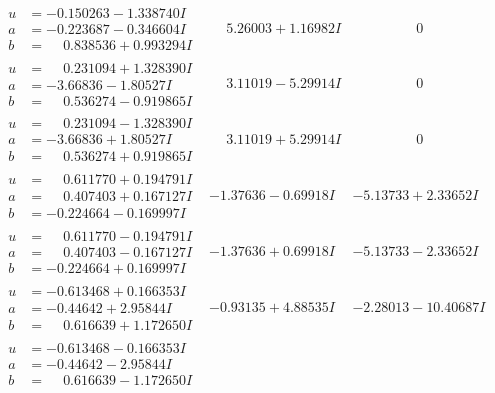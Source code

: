 \documentclass[1p]{elsarticle_modified}
\theoremstyle{definition}
\begin{document}
$$\begin{array}{c|c|c}
\begin{aligned}
u &= -0.150263 - 1.338740 I \\
a &= -0.223687 - 0.346604 I \\
b &= \phantom{-}0.838536 + 0.993294 I\end{aligned}
 & \phantom{-}5.26003 + 1.16982 I & \phantom{-0.000000 } 0 \\ \hline\begin{aligned}
u &= \phantom{-}0.231094 + 1.328390 I \\
a &= -3.66836 - 1.80527 I \\
b &= \phantom{-}0.536274 - 0.919865 I\end{aligned}
 & \phantom{-}3.11019 - 5.29914 I & \phantom{-0.000000 } 0 \\ \hline\begin{aligned}
u &= \phantom{-}0.231094 - 1.328390 I \\
a &= -3.66836 + 1.80527 I \\
b &= \phantom{-}0.536274 + 0.919865 I\end{aligned}
 & \phantom{-}3.11019 + 5.29914 I & \phantom{-0.000000 } 0 \\ \hline\begin{aligned}
u &= \phantom{-}0.611770 + 0.194791 I \\
a &= \phantom{-}0.407403 + 0.167127 I \\
b &= -0.224664 - 0.169997 I\end{aligned}
 & -1.37636 - 0.69918 I & -5.13733 + 2.33652 I \\ \hline\begin{aligned}
u &= \phantom{-}0.611770 - 0.194791 I \\
a &= \phantom{-}0.407403 - 0.167127 I \\
b &= -0.224664 + 0.169997 I\end{aligned}
 & -1.37636 + 0.69918 I & -5.13733 - 2.33652 I \\ \hline\begin{aligned}
u &= -0.613468 + 0.166353 I \\
a &= -0.44642 + 2.95844 I \\
b &= \phantom{-}0.616639 + 1.172650 I\end{aligned}
 & -0.93135 + 4.88535 I & -2.28013 - 10.40687 I \\ \hline\begin{aligned}
u &= -0.613468 - 0.166353 I \\
a &= -0.44642 - 2.95844 I \\
b &= \phantom{-}0.616639 - 1.172650 I\end{aligned}

\end{array}$$
\end{document}
